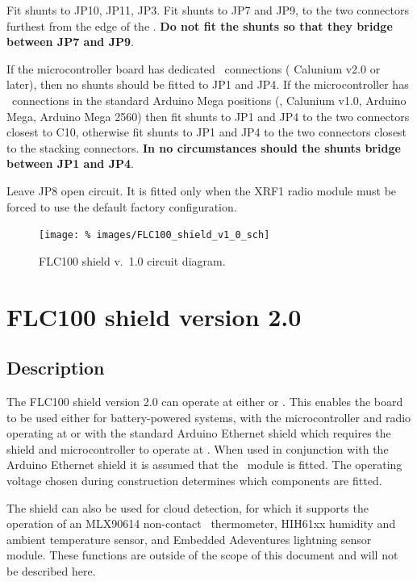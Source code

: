 Fit shunts to JP10, JP11, JP3. Fit shunts to JP7 and JP9, to the two
connectors furthest from the edge of the \pcb. \textbf{Do not fit the
  shunts so that they bridge between JP7 and JP9}.

If the microcontroller board has dedicated \itwoc\ connections (\eg
Calunium v2.0 or later), then no shunts should be fitted to JP1 and
JP4. If the microcontroller has \itwoc\ connections in the standard
Arduino Mega positions (\eg, Calunium v1.0, Arduino Mega, Arduino Mega
2560) then fit shunts to JP1 and JP4 to the two connectors closest to
C10, otherwise fit shunts to JP1 and JP4 to the two connectors closest
to the stacking connectors. \textbf{In no circumstances should the
  shunts bridge between JP1 and JP4}.

Leave JP8 open circuit. It is fitted only when the XRF1 radio module
must be forced to use the default factory configuration.

\begin{landscape}
  \begin{figure}[p]
    \centering
    \texttt{[image: \%
      images/FLC100\_shield\_v1\_0\_sch]}
    \caption{FLC100 shield v.~1.0 circuit diagram.}
    \label{fig:flc100-shield-v1.0-cct-diag}
  \end{figure}
\end{landscape}

\section{FLC100 shield version 2.0}

\subsection{Description}

The FLC100 shield version 2.0 can operate at either  or
. This enables the board to be used either for battery-powered
systems, with the microcontroller and radio operating at  or
with the standard Arduino Ethernet shield which requires the shield
and microcontroller to operate at . When used in conjunction
with the Arduino Ethernet shield it is assumed that the \PoE\ module
is fitted. The operating voltage chosen during construction determines
which components are fitted.

The shield can also be used for cloud detection, for which it supports
the operation of an MLX90614 non-contact \ir\ thermometer, HIH61xx
humidity and ambient temperature sensor, and Embedded Adeventures
lightning sensor module. These functions are outside of the scope of
this document and will not be described here.

